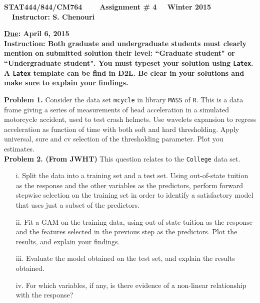 \documentclass[11pt]{report}
\begin{document}
\begin{center}
{\bf STAT444/844/CM764 ~~~ Assignment \# 4 ~~Winter 2015 ~~Instructor: S. Chenouri}
\end{center} 
\noindent
{\bf \underline {Due}: April 6, 2015}\\

\noindent
{\bf Instruction: Both graduate and undergraduate students must clearly mention on submitted solution their level: ``Graduate student" or ``Undergraduate student". You must typeset your solution using {\tt Latex}. A  {\tt Latex} template can be find in D2L. Be clear in your solutions and make sure to explain your findings.} \\
\vspace{1mm} 

\noindent
{\bf Problem 1.} Consider the data set {\tt mcycle} in library {\tt MASS} of {\tt R}. This is a data frame giving a series of measurements of head acceleration in a simulated motorcycle accident, used to test crash helmets. Use wavelets expansion to regress acceleration as function of time with both soft and hard thresholding. Apply universal, sure and cv selection of the thresholding parameter. Plot you estimates.  \\

\noindent
{\bf Problem 2. (From JWHT)} This question relates to the {\tt College} data set.
\begin{itemize}
\item[i. ] Split the data into a training set and a test set. Using out-of-state tuition as the response and the other variables as the predictors, perform forward stepwise selection on the training set in order to identify a satisfactory model that uses just a subset of the predictors.
\item[ii. ] Fit a GAM on the training data, using out-of-state tuition as the response and the features selected in the previous step as the predictors. Plot the results, and explain your findings.
\item[iii. ] Evaluate the model obtained on the test set, and explain the results obtained.
\item[iv. ] For which variables, if any, is there evidence of a non-linear relationship with the response?
\end{itemize}
\\
\end{document}
